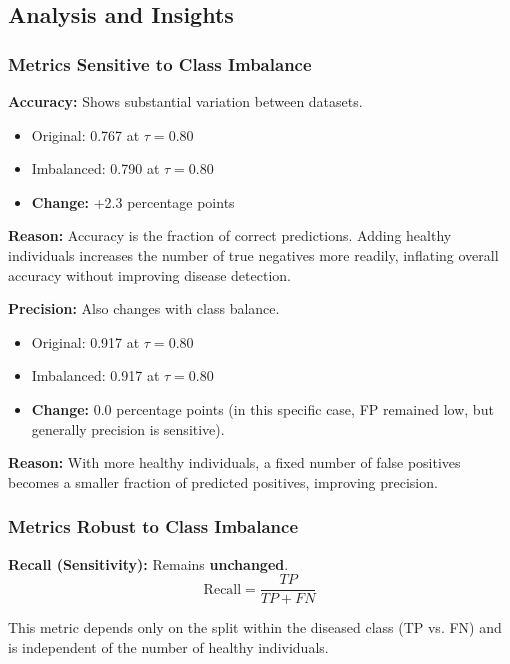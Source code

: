 \documentclass[11pt]{article}
\begin{document}
\subsection{Analysis and Insights}

\subsubsection{Metrics Sensitive to Class Imbalance}

\textbf{Accuracy:} Shows substantial variation between datasets.
\begin{itemize}
    \item Original: 0.767 at $\tau=0.80$
    \item Imbalanced: 0.790 at $\tau=0.80$
    \item \textbf{Change:} +2.3 percentage points
\end{itemize}

\textbf{Reason:} Accuracy is the fraction of correct predictions. Adding healthy individuals increases the number of true negatives more readily, inflating overall accuracy without improving disease detection.

\textbf{Precision:} Also changes with class balance.
\begin{itemize}
    \item Original: 0.917 at $\tau=0.80$
    \item Imbalanced: 0.917 at $\tau=0.80$
    \item \textbf{Change:} 0.0 percentage points (in this specific case, FP remained low, but generally precision is sensitive).
\end{itemize}

\textbf{Reason:} With more healthy individuals, a fixed number of false positives becomes a smaller fraction of predicted positives, improving precision.

\subsubsection{Metrics Robust to Class Imbalance}

\textbf{Recall (Sensitivity):} Remains \textbf{unchanged}.
\begin{equation}
    \text{Recall} = \frac{TP}{TP + FN}
\end{equation}

This metric depends only on the split within the diseased class (TP vs. FN) and is independent of the number of healthy individuals.
\end{document}
